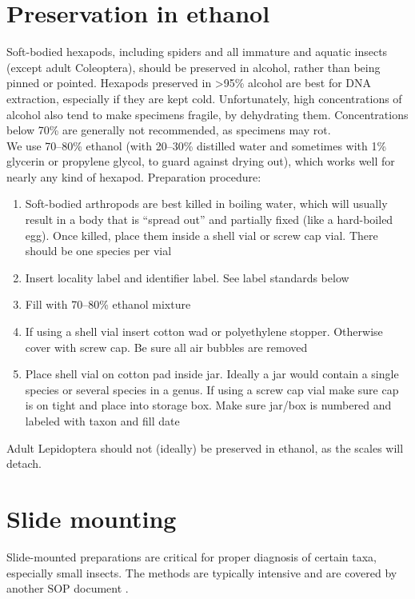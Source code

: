 \section{Preservation in ethanol}\label{ethanol}
Soft-bodied hexapods, including spiders and all immature and aquatic insects (except adult Coleoptera), should be preserved in alcohol, rather than being pinned or pointed. Hexapods preserved in \textgreater95\% alcohol are best for DNA extraction, especially if they are kept cold. Unfortunately, high concentrations of alcohol also tend to make specimens fragile, by dehydrating them. Concentrations below 70\% are generally not recommended, as specimens may rot. \\

\noindent{}We use 70--80\% ethanol (with 20--30\% distilled water and sometimes with 1\% glycerin or propylene glycol, to guard against drying out), which works well for nearly any kind of hexapod. Preparation procedure:
\begin{enumerate}
\item Soft-bodied arthropods are best killed in boiling water, which will usually result in a body that is ``spread out'' and partially fixed (like a hard-boiled egg). Once killed, place them inside a shell vial or screw cap vial. There should be one species per vial
\item Insert locality label and identifier label. See label standards below
\item Fill with 70--80\% ethanol mixture
\item If using a shell vial insert cotton wad or polyethylene stopper. Otherwise cover with screw cap. Be sure all air bubbles are removed
\item Place shell vial on cotton pad inside jar. Ideally a jar would contain a single species or several species in a genus. If using a screw cap vial make sure cap is on tight and place into storage box. Make sure jar/box is numbered and labeled with taxon and fill date
\end{enumerate}

\noindent{} Adult Lepidoptera should not (ideally) be preserved in ethanol, as the scales will detach.

\section{Slide mounting}\label{slides}
Slide-mounted preparations are critical for proper diagnosis of certain taxa, especially small insects. The methods are typically intensive and are covered by another SOP document \cite{SlideMounting}.

